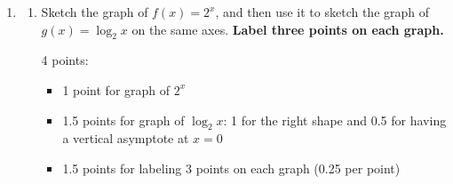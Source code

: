 \documentclass{article}
\begin{document}
\begin{enumerate}
\begin{enumerate}
    \begin{solution}
      $\log_k 1$ is the number to which we need to
      raise $k$ to get $1$, so 
      $\log_k 1=\boxed{0}$.
    \end{solution}

  \item
    \begin{problem}[\vfill\newpage]
      $\log_k (k^x k^y)$
    \end{problem}

    \begin{solution}
      $\log_k (k^x k^y)$ is the number to which we need to
      raise $k$ to get $k^x k^y$. We can rewrite $k^x k^y$ as 
      $k^{x+y}$. So
      $\log_k (k^x k^y)=\boxed{x+y}$.
    \end{solution}

  \end{enumerate}   

\item  \begin{enumerate}
  \item %

    \begin{problem}[\vfill]
      Sketch the graph of $f(x) = 2^x$, and then use it to sketch the graph of $g(x) = \log_2 x$ on the same axes. {\bf Label three points on each graph.}
    \end{problem}

    \begin{grading} 
      4 points:
      \begin{itemize}[nosep]
      \item 1 point for graph of $2^x$
      \item 1.5 points for graph of $\log_2 x$: 1 for the right shape and 0.5 for having a vertical asymptote at $x = 0$
      \item 1.5 points for labeling 3 points on each graph (0.25 per point) 
      \end{itemize}
    \end{grading} 


\end{enumerate}
\end{enumerate}
\end{document}
